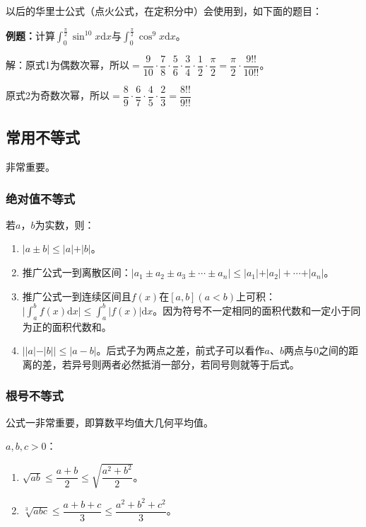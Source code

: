 \documentclass[UTF8, 12pt]{ctexart}
\begin{document}
以后的华里士公式（点火公式，在定积分中）会使用到，如下面的题目：

\textbf{例题：}计算$\int_0^{\frac{\pi}{2}}\sin^{10}x\textrm{d}x$与$\int_0^{\frac{\pi}{2}}\cos^9x\textrm{d}x$。\medskip

解：原式1为偶数次幂，所以$=\dfrac{9}{10}\cdot\dfrac{7}{8}\cdot\dfrac{5}{6}\cdot\dfrac{3}{4}\cdot\dfrac{1}{2}\cdot\dfrac{\pi}{2}=\dfrac{\pi}{2}\cdot\dfrac{9!!}{10!!}$。\medskip

原式2为奇数次幂，所以$=\dfrac{8}{9}\cdot\dfrac{6}{7}\cdot\dfrac{4}{5}\cdot\dfrac{2}{3}=\dfrac{8!!}{9!!}$

\subsection{常用不等式}

非常重要。

\subsubsection{绝对值不等式}

若$a$，$b$为实数，则：

\begin{enumerate}
    \item $\vert a\pm b\vert\leqslant\vert a\vert+\vert b\vert$。
    \item 推广公式一到离散区间：$\vert a_1\pm a_2\pm a_3\pm\cdots\pm a_n\vert\leqslant\vert a_1\vert+\vert a_2\vert+\cdots+\vert a_n\vert$。
    \item 推广公式一到连续区间且$f(x)$在$[a,b](a<b)$上可积：$\vert\int_a^bf(x)\textrm{d}x\vert\leqslant\int_a^b\vert f(x)\vert\textrm{d}x$。因为符号不一定相同的面积代数和一定小于同为正的面积代数和。
    \item $\vert\vert a\vert-\vert b\vert\vert\leqslant\vert a-b\vert$。后式子为两点之差，前式子可以看作$a$、$b$两点与0之间的距离的差，若异号则两者必然抵消一部分，若同号则就等于后式。
\end{enumerate}



\subsubsection{根号不等式}

公式一非常重要，即算数平均值大几何平均值。

$a,b,c>0$：

\begin{enumerate}
    \item $\sqrt{ab}\leqslant\dfrac{a+b}{2}\leqslant\sqrt{\dfrac{a^2+b^2}{2}}$。
    \item $\sqrt[3]{abc}\leqslant\dfrac{a+b+c}{3}\leqslant\dfrac{a^2+b^2+c^2}{3}$。
\end{enumerate}
\end{document}
